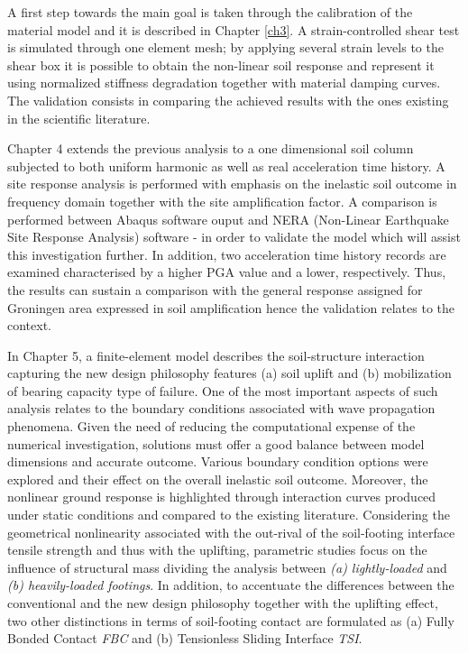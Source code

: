 \documentclass[12pt,a4paper]{report}
\begin{document}
A first step towards the main goal is taken through the calibration of the material model and it is described in Chapter \ref{ch3}. A strain-controlled shear test is simulated through one element mesh;  by applying several strain levels to the shear box it is possible to obtain the non-linear soil response and represent it using normalized stiffness degradation together with material damping curves. The validation consists in comparing the achieved results with the ones existing in the scientific literature.

Chapter 4 extends the previous analysis to a one dimensional soil column subjected to both uniform harmonic as well as real acceleration time history. A site response analysis is performed with emphasis on the inelastic soil outcome in frequency domain together with the site amplification factor. A comparison is performed between Abaqus software ouput and NERA (Non-Linear Earthquake Site Response Analysis) software - in order to validate the model which will assist this investigation further.  In addition, two acceleration time history records  are examined characterised by a higher PGA value and a lower, respectively. Thus, the results can sustain a comparison with the general response assigned for Groningen area expressed in soil amplification hence the validation relates to the context.

In Chapter 5, a finite-element model describes the soil-structure interaction capturing the new design philosophy features (a) soil uplift and (b) mobilization of bearing capacity type of failure. One of the most important aspects of such analysis relates to the boundary conditions associated with wave propagation phenomena. Given the need of reducing the computational expense of the numerical investigation, solutions must offer a good balance between model dimensions and accurate outcome. Various boundary condition options were explored and their effect on the overall inelastic soil outcome. Moreover, the nonlinear ground response is highlighted through interaction curves produced under static conditions and compared to the existing literature. Considering the geometrical nonlinearity associated with the out-rival of the soil-footing interface tensile strength and thus with the uplifting, parametric studies focus on the influence of structural mass dividing the analysis between \textit{(a) lightly-loaded} and \textit{(b) heavily-loaded footings}. In addition, to accentuate the differences between the conventional and the new design philosophy together with the uplifting effect, two other distinctions in terms of soil-footing contact are formulated as (a) Fully Bonded Contact \textit{FBC} and (b) Tensionless Sliding Interface \textit{TSI}.
\end{document}
